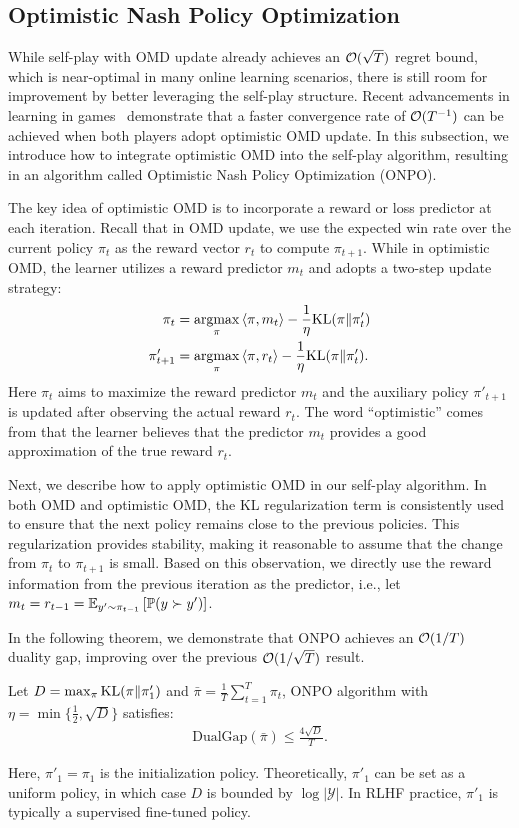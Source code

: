 \subsection{Optimistic Nash Policy Optimization}
While self-play with OMD update already achieves an $\mathcal O(\sqrt{T})$ regret bound, which is near-optimal in many online learning scenarios, there is still room for improvement by better leveraging the self-play structure. Recent advancements in learning in games~\citep{rakhlin2013optimization, syrgkanis2015fast} demonstrate that a faster convergence rate of $\mathcal O(T^{-1})$ can be achieved when both players adopt optimistic OMD update. In this subsection, we introduce how to integrate optimistic OMD into the self-play algorithm, resulting in an algorithm called Optimistic Nash Policy Optimization (ONPO).

The key idea of optimistic OMD is to incorporate a reward or loss predictor at each iteration. Recall that in OMD update, we use the expected win rate over the current policy $\pi_t$ as the reward vector $r_t$ to compute $\pi_{t+1}$. While in optimistic OMD, the learner utilizes a reward predictor $m_t$ and adopts a two-step update strategy:
\begin{align*}
\pi_t&=\mathop{\mathrm{argmax}}_{\pi} \left\langle\pi,m_t\right\rangle-\frac{1}{\eta}\mathrm{KL}(\pi \Vert \pi'_t)  \\
\pi'_{t+1}&=\mathop{\mathrm{argmax}}_{\pi} \left\langle\pi,r_t\right\rangle-\frac{1}{\eta}\mathrm{KL}(\pi \Vert \pi'_t).
\end{align*}
Here $\pi_t$ aims to maximize the reward predictor $m_t$ and the auxiliary policy $\pi'_{t+1}$ is updated after observing the actual reward $r_t$. The word ``optimistic'' comes from that the learner believes that the predictor $m_t$ provides a good approximation of the true reward $r_t$.

Next, we describe how to apply optimistic OMD in our self-play algorithm. In both OMD and optimistic OMD, the KL regularization term is consistently used to ensure that the next policy remains close to the previous policies. This regularization provides stability, making it reasonable to assume that the change from $\pi_t$ to $\pi_{t+1}$ is small. Based on this observation, we directly use the reward information from the previous iteration as the predictor, i.e., let $m_t=r_{t-1}=\mathbb{E}_{y
' \sim \pi_{t-1}}\left[\mathbb{P}(y \succ y')\right]$.

In the following theorem, we demonstrate that ONPO achieves an $\mathcal O(1/T)$ duality gap, improving over the previous $\mathcal O(1/\sqrt{T})$ result. 
\begin{theorem}\label{thm:onpo_regret}
Let $D=\max_{\pi} \mathrm{KL}(\pi \Vert \pi'_1)$ and $\bar \pi=\frac{1}{T}\sum_{t=1}^T \pi_t$, ONPO algorithm with $\eta = \min\{\frac{1}{2},\sqrt{D}\}$ satisfies:
\begin{align*}
\mathrm{DualGap}(\bar \pi) \le \frac{4\sqrt{D}}{T}.
\end{align*}
\end{theorem}
Here, $\pi'_1 = \pi_1$ is the initialization policy. Theoretically, $\pi'_1$ can be set as a uniform policy, in which case $D$ is bounded by $\log |\mathcal{Y}|$. In RLHF practice, $\pi'_1$ is typically a supervised fine-tuned policy.

